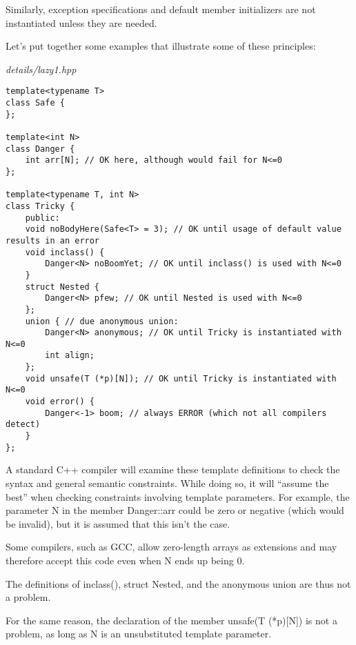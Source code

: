 Similarly, exception specifications and default member initializers are not instantiated unless they are needed.

Let’s put together some examples that illustrate some of these principles:

\noindent
\textit{details/lazy1.hpp}
\begin{lstlisting}[style=styleCXX]
template<typename T>
class Safe {
};

template<int N>
class Danger {
	int arr[N]; // OK here, although would fail for N<=0
};

template<typename T, int N>
class Tricky {
	public:
	void noBodyHere(Safe<T> = 3); // OK until usage of default value results in an error
	void inclass() {
		Danger<N> noBoomYet; // OK until inclass() is used with N<=0
	}
	struct Nested {
		Danger<N> pfew; // OK until Nested is used with N<=0
	};
	union { // due anonymous union:
		Danger<N> anonymous; // OK until Tricky is instantiated with N<=0
		int align;
	};
	void unsafe(T (*p)[N]); // OK until Tricky is instantiated with N<=0
	void error() {
		Danger<-1> boom; // always ERROR (which not all compilers detect)
	}
};
\end{lstlisting}

A standard C++ compiler will examine these template definitions to check the syntax and general semantic constraints. While doing so, it will “assume the best” when checking constraints involving template parameters. For example, the parameter N in the member Danger::arr could be zero or negative (which would be invalid), but it is assumed that this isn’t the case.

\begin{tcolorbox}[colback=webgreen!5!white,colframe=webgreen!75!black]
\hspace*{0.75cm}Some compilers, such as GCC, allow zero-length arrays as extensions and may therefore accept this code even when N ends up being 0.
\end{tcolorbox}

The definitions of inclass(), struct Nested, and the anonymous union are thus not a problem.

For the same reason, the declaration of the member unsafe(T (*p)[N]) is not a problem, as long as N is an unsubstituted template parameter.

